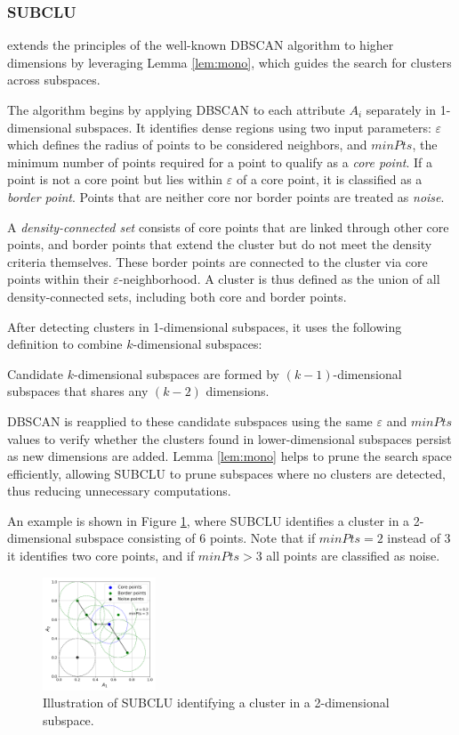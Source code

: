 \subsubsection{SUBCLU}
extends the principles of the well-known DBSCAN algorithm \cite{dbscan} to higher dimensions by leveraging Lemma \ref{lem:mono}, which guides the search for clusters across subspaces.

The algorithm begins by applying DBSCAN to each attribute $A_i$ separately in 1-dimensional subspaces. It identifies dense regions using two input parameters: $\varepsilon$ which defines the radius of points to be considered neighbors, and $minPts$, the minimum number of points required for a point to qualify as a \textit{core point}. If a point is not a core point but lies within $\varepsilon$ of a core point, it is classified as a \textit{border point}. Points that are neither core nor border points are treated as \textit{noise}.

A \textit{density-connected set} consists of core points that are linked through other core points, and border points that extend the cluster but do not meet the density criteria themselves. These border points are connected to the cluster via core points within their $\varepsilon$-neighborhood. A cluster is thus defined as the union of all density-connected sets, including both core and border points.

After detecting clusters in 1-dimensional subspaces, it uses the following definition to combine $k$-dimensional subspaces:
\begin{definition}
    Candidate $k$-dimensional subspaces are formed by $(k-1)$-dimensional subspaces that shares any $(k-2)$ dimensions.
\end{definition}
DBSCAN is reapplied to these candidate subspaces using the same $\varepsilon$ and $minPts$ values to verify whether the clusters found in lower-dimensional subspaces persist as new dimensions are added. Lemma \ref{lem:mono} helps to prune the search space efficiently, allowing SUBCLU to prune subspaces where no clusters are detected, thus reducing unnecessary computations.

An example is shown in Figure \ref{fig:subclu}, where SUBCLU identifies a cluster in a 2-dimensional subspace consisting of 6 points. Note that if $minPts = 2$ instead of 3 it identifies two core points, and if $minPts > 3$ all points are classified as noise.
\begin{figure}[H]
    \vspace*{-0.5cm}
    \centering
    \includegraphics[width=0.3\textwidth]{figures/subclu.png}
    \caption{Illustration of SUBCLU identifying a cluster in a 2-dimensional subspace.}
    \label{fig:subclu}
    \vspace*{-0.5cm}
\end{figure}